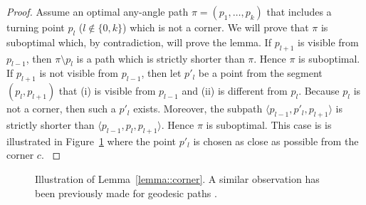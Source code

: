\begin{proof}
{
  Assume an optimal any-angle path $\pi = (p_1,\dots,p_k)$ 
  that includes a turning point $p_l$ ($l \not\in \{0,k\}$) 
  which is not a corner.  
  We will prove that $\pi$ is suboptimal 
  which, by contradiction, will prove the lemma.  
  If $p_{l+1}$ is visible from $p_{l-1}$, 
  then  $\pi \setminus p_l$ is a path 
  which is strictly shorter than $\pi$.  
  Hence $\pi$ is suboptimal.  
  If $p_{l+1}$ is not visible from $p_{l-1}$, 
  then let $p'_{l}$ be a point from the segment $(p_l,p_{l+1})$ 
  that (i) is visible from $p_{l-1}$ 
  and (ii) is different from $p_l$.  
  Because $p_l$ is not a corner, 
  then such a $p'_l$ exists.  
  Moreover, the subpath $\langle p_{l-1}, p'_{l}, p_{l+1} \rangle$ is 
  strictly shorter than $\langle p_{l-1}, p_{l}, p_{l+1}\rangle$. 
  Hence $\pi$ is suboptimal.
  This case is is illustrated in Figure~\ref{fig::corner}  
  where the point $p'_l$ is chosen as close as possible from the corner $c$.  
}
\end{proof}


\begin{figure}[tb]
  \begin{center}
    
  \end{center}
  \caption{Illustration of Lemma~\ref{lemma::corner}.
  A similar observation has been previously made for geodesic paths \cite{mitchell87}.  }
  \label{fig::corner}
\end{figure}


